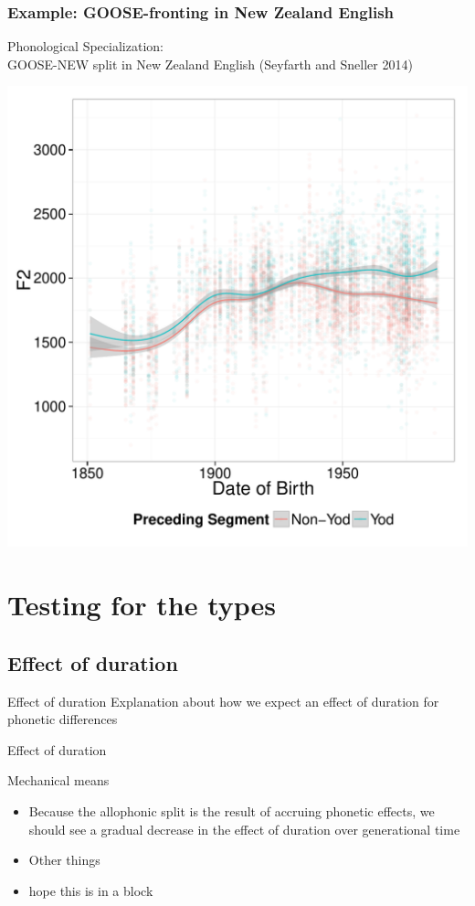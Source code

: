 \documentclass[hyperref={pdfpagelabels=false}]{beamer}
\begin{document}
\subsubsection{Example: GOOSE-fronting in New Zealand English}
\begin{frame}{Phonological Specialization: \\ \small{GOOSE-NEW split in New Zealand English (Seyfarth and Sneller 2014)}}

\begin{center}
\includegraphics[width=.7\textwidth]{ByTokenOldPreceding.pdf}
\end{center}
\end{frame}

\section{Testing for the types}

\subsection{Effect of duration}
\begin{frame}{Effect of duration}
	Explanation about how we expect an effect of duration for phonetic differences
\end{frame}

\begin{frame}{Effect of duration}
	\begin{block}{Mechanical means}
		\begin{itemize}
			\item Because the allophonic split is the result of accruing phonetic effects, we should see a gradual decrease in the effect of duration over generational time 
			\item Other things
			\item hope this is in a block
		\end{itemize}
	\end{block}	
\end{frame}
\end{document}
